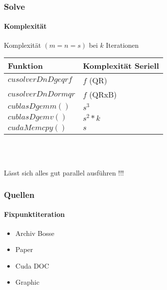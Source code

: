 \begin{frame}[fragile]
	\frametitle{Solve}
	\framesubtitle{Komplexität}
	Komplexität $(m=n=s)$ bei $k$ Iterationen\\
	\begin{center}
		\begin{tabular}{ l | l}
			Funktion & Komplexität Seriell \\
			\hline
			$cusolverDnDgeqrf$ & $f$ (QR) \\
			$cusolverDnDormqr$ & $f$ (QRxB) \\
			$cublasDgemm()$& $s^3$ \\
			$cublasDgemv()$ & $s^2 * k$  \\
			$cudaMemcpy()$ & $s$ \\
		\end{tabular} 	\\~\\
	\end{center}
	Lässt sich alles gut parallel ausführen !!!
\end{frame}
\begin{frame}
	\frametitle{Quellen}
	\framesubtitle{Fixpunktiteration}
	\begin{itemize}
		\item Archiv Bosse
		\item Paper
		\item Cuda DOC
		\item Graphic
	\end{itemize}
\end{frame}